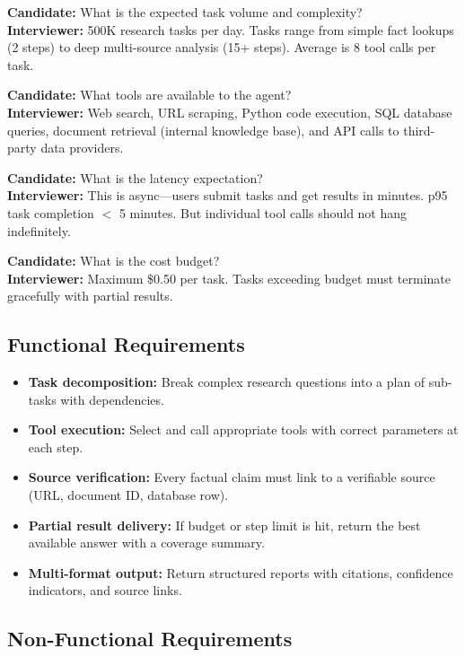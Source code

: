 \textbf{Candidate:} What is the expected task volume and complexity?\\
\textbf{Interviewer:} 500K research tasks per day. Tasks range from simple fact lookups (2 steps) to deep multi-source analysis (15+ steps). Average is 8 tool calls per task.

\textbf{Candidate:} What tools are available to the agent?\\
\textbf{Interviewer:} Web search, URL scraping, Python code execution, SQL database queries, document retrieval (internal knowledge base), and API calls to third-party data providers.

\textbf{Candidate:} What is the latency expectation?\\
\textbf{Interviewer:} This is async---users submit tasks and get results in minutes. p95 task completion $<$ 5 minutes. But individual tool calls should not hang indefinitely.

\textbf{Candidate:} What is the cost budget?\\
\textbf{Interviewer:} Maximum \$0.50 per task. Tasks exceeding budget must terminate gracefully with partial results.

\subsection*{Functional Requirements}

\begin{itemize}
  \item \textbf{Task decomposition:} Break complex research questions into a plan of sub-tasks with dependencies.
  \item \textbf{Tool execution:} Select and call appropriate tools with correct parameters at each step.
  \item \textbf{Source verification:} Every factual claim must link to a verifiable source (URL, document ID, database row).
  \item \textbf{Partial result delivery:} If budget or step limit is hit, return the best available answer with a coverage summary.
  \item \textbf{Multi-format output:} Return structured reports with citations, confidence indicators, and source links.
\end{itemize}

\subsection*{Non-Functional Requirements}

